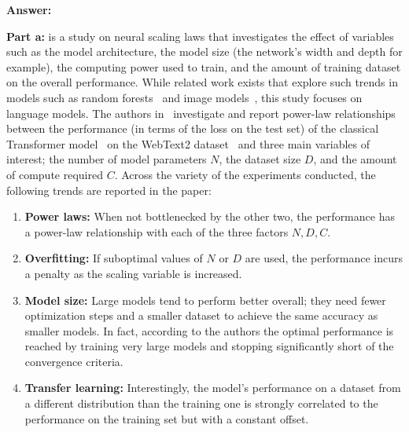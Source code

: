 {\bf Answer:}

{\bf Part a:} \citep{kaplan2020scaling} is a study on neural scaling laws that investigates the effect of variables such as the model architecture, the model size (the network's width and depth for example), the computing power used to train, and the amount of training dataset on the overall performance. While related work exists that explore such trends in models such as random forests~\citep{biau2012analysis} and image models~\citep{tan2019efficientnet}, this study focuses on language models. The authors in~\citep{kaplan2020scaling} investigate and report power-law relationships between the performance (in terms of the loss on the test set) of the classical Transformer model~\citep{vaswani2017attention} on the WebText2 dataset~\citep{radford2019language} and three main variables of interest; the number of model parameters $N$, the dataset size $D$, and the amount of compute required $C$. Across the variety of the experiments conducted, the following trends are reported in the paper:
\begin{enumerate}
\item {\bf Power laws:} When not bottlenecked by the other two, the performance has a power-law relationship with each of the three factors $N, D, C$.
\item {\bf Overfitting:} If suboptimal values of $N$ or $D$ are used, the performance incurs a penalty as the scaling variable is increased.
\item {\bf Model size:} Large models tend to perform better overall; they need fewer optimization steps and a smaller dataset to achieve the same accuracy as smaller models. In fact, according to the authors the optimal performance is reached by training very large models and stopping significantly short of the convergence criteria.
\item {\bf Transfer learning:} Interestingly, the model's performance on a dataset from a different distribution than the training one is strongly correlated to the performance on the training set but with a constant offset.
\end{enumerate}
%
